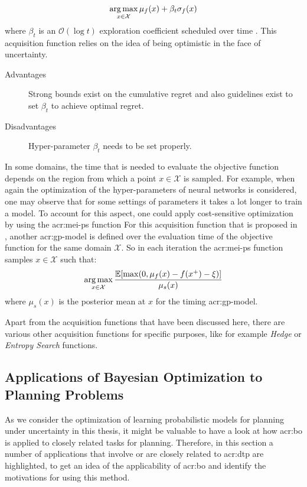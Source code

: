 \begin{description}
	$$\operatorname*{arg\,max}_{x \in \mathcal{X}} \mu_f(x) + \beta_t\sigma_f(x)$$
	where $\beta_t$ is an $\mathcal{O}(\log{t})$ exploration coefficient scheduled over time \cite{perchet2014gaussian}. This acquisition function relies on the idea of being optimistic in the face of uncertainty.
	\begin{description}
		\item[Advantages] Strong bounds exist on the cumulative regret and also guidelines exist to set $\beta_t$ to achieve optimal regret.
		\item[Disadvantages] Hyper-parameter $\beta_t$ needs to be set properly.
	\end{description}
\end{description}

In some domains, the time that is needed to evaluate the objective function depends on the region from which a point $x \in \mathcal{X}$ is sampled.
For example, when again the optimization of the hyper-parameters of neural networks is considered, one may observe that for some settings of parameters it takes a lot longer to train a model.
To account for this aspect, one could apply cost-sensitive optimization by using the \acrfull{acr:mei-ps} function
For this acquisition function that is proposed in \cite{snoek2012practical}, another \acrshort{acr:gp}-model is defined over the evaluation time of the objective function for the same domain $\mathcal{X}$.
So in each iteration the \acrshort{acr:mei-ps} function samples $x \in \mathcal{X}$ such that:
$$\operatorname*{arg\,max}_{x \in \mathcal{X}} \frac{\mathbb{E}[\max(0, \mu_f(x) - f(x^+) - \xi)]}{\mu_s(x)}$$
where $\mu_s(x)$ is the posterior mean at $x$ for the timing \acrshort{acr:gp}-model.

Apart from the acquisition functions that have been discussed here, there are various other acquisition functions for specific purposes, like for example \textit{Hedge} \cite{hoffman2011portfolio} or \textit{Entropy Search} \cite{wang2016optimization} functions.


\subsection{Applications of Bayesian Optimization to Planning Problems}
\label{sec:bayesian-optimization-applications}

As we consider the optimization of learning probabilistic models for planning under uncertainty in this thesis, it might be valuable to have a look at how \acrlong{acr:bo} is applied to closely related tasks for planning.
Therefore, in this section a number of applications that involve or are closely related to \acrshort{acr:dtp} are highlighted, to get an idea of the applicability of \acrlong{acr:bo} and identify the motivations for using this method.

